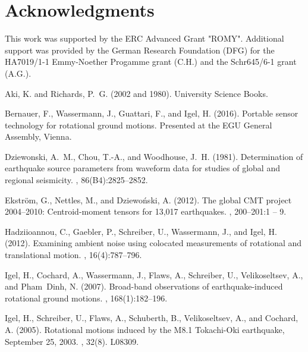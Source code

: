 \documentclass[12pt,reqno,letter]{article}
\begin{document}
\section*{Acknowledgments}
This work was supported by the ERC Advanced Grant "ROMY". Additional support was provided by the German Research Foundation (DFG) for the HA7019/1-1 Emmy-Noether Progamme grant (C.H.) and the Schr645/6-1 grant (A.G.).


\label{Bibliography}
\begin{thebibliography}{}

{Aki}, K. and {Richards}, P.~G. (2002 and 1980).
\newblock University Science Books.

Bernauer, F., Wassermann, J., Guattari, F., and Igel, H. (2016).
\newblock Portable sensor technology for rotational ground motions.
\newblock Presented at the EGU General Assembly, Vienna.

Dziewonski, A.~M., Chou, T.-A., and Woodhouse, J.~H. (1981).
\newblock Determination of earthquake source parameters from waveform data for
  studies of global and regional seismicity.
,
  86(B4):2825--2852.

Ekstr{\"o}m, G., Nettles, M., and Dziewo\'{n}ski, A. (2012).
\newblock The global {CMT} project 2004–2010: Centroid-moment tensors for
  13,017 earthquakes.
, 200–201:1 -- 9.

Hadziioannou, C., Gaebler, P., Schreiber, U., Wassermann, J., and Igel, H.
  (2012).
\newblock Examining ambient noise using colocated measurements of rotational
  and translational motion.
, 16(4):787--796.

Igel, H., Cochard, A., Wassermann, J., Flaws, A., Schreiber, U., Velikoseltsev,
  A., and Pham~Dinh, N. (2007).
\newblock Broad-band observations of earthquake-induced rotational ground
  motions.
, 168(1):182--196.

Igel, H., Schreiber, U., Flaws, A., Schuberth, B., Velikoseltsev, A., and
  Cochard, A. (2005).
\newblock Rotational motions induced by the {M}8.1 Tokachi-{O}ki earthquake,
  {S}eptember 25, 2003.
, 32(8).
\newblock L08309.


\end{thebibliography}
\end{document}

